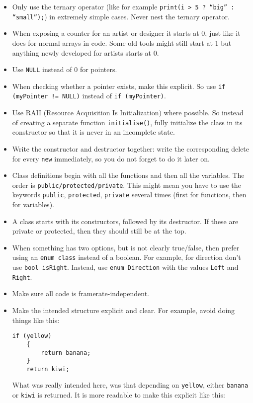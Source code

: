 \documentclass{article}
\begin{document}
\begin{itemize}
    \item Only use the ternary operator (like for example \texttt{print(i > 5 ? “big” : “small”);}) in extremely simple cases. Never nest the ternary operator.
    \item When exposing a counter for an artist or designer it starts at 0, just like it does for normal arrays in code. Some old tools might still start at 1 but anything newly developed for artists starts at 0.
    \item Use \texttt{NULL} instead of 0 for pointers.
    \item When checking whether a pointer exists, make this explicit. So use \texttt{if (myPointer != NULL)} instead of \texttt{if (myPointer)}.
    \item Use RAII (Resource Acquisition Is Initialization) where possible. So instead of creating a separate function \texttt{initialise()}, fully initialize the class in its constructor so that it is never in an incomplete state.
    \item Write the constructor and destructor together: write the corresponding delete for every \texttt{new} immediately, so you do not forget to do it later on.
    \item Class definitions begin with all the functions and then all the variables. The order is \texttt{public/protected/private}. This might mean you have to use the keywords \texttt{public}, \texttt{protected}, \texttt{private} several times (first for functions, then for variables).
    \item A class starts with its constructors, followed by its destructor. If these are private or protected, then they should still be at the top.
    \item When something has two options, but is not clearly true/false, then prefer using an \texttt{enum class} instead of a boolean. For example, for direction don't use \texttt{bool isRight}. Instead, use \texttt{enum Direction} with the values \texttt{Left} and \texttt{Right}.
    \item Make sure all code is framerate-independent.
    \item Make the intended structure explicit and clear. For example, avoid doing things like this:
    \begin{Verbatim}[fontsize=\small]
    if (yellow)
    {
        return banana;
    }
    return kiwi;
    \end{Verbatim}
    What was really intended here, was that depending on \texttt{yellow}, either \texttt{banana} or \texttt{kiwi} is returned. It is more readable to make this explicit like this:

\end{itemize}
\end{document}
